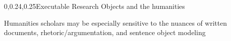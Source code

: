 \begin{frame}{}
{\begin{center}
\begin{minipage}{.9\textwidth}
{\begin{minipage}{\textwidth}
\begin{lightquadblockc}{0,0.24,0.25}{Executable Research Objects and the humanities}
\begin{itemize}
\sqitem   {\lsep} \parbox[t]{17cm}{Humanities scholars may be especially sensitive 
to the nuances of written documents, rhetoric/argumentation, and sentence object modeling}\vspace{1.5em}
\end{itemize} 
\end{lightquadblockc}
\end{minipage}}

\end{minipage}
\end{center}
}

\end{frame}

